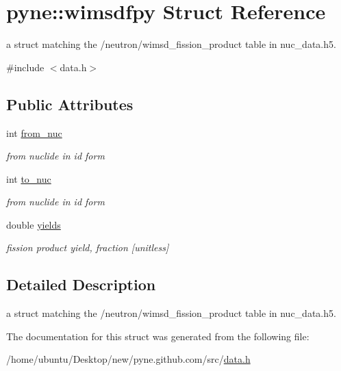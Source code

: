 \hypertarget{structpyne_1_1wimsdfpy}{}\section{pyne\+:\+:wimsdfpy Struct Reference}
\label{structpyne_1_1wimsdfpy}


a struct matching the \textquotesingle{}/neutron/wimsd\+\_\+fission\+\_\+product\textquotesingle{} table in nuc\+\_\+data.\+h5.  




{\ttfamily \#include $<$data.\+h$>$}

\subsection*{Public Attributes}
\begin{DoxyCompactItemize}
\item 
int \hyperlink{structpyne_1_1wimsdfpy_a7521e458719ebb8ed23f4912ec4555f8}{from\+\_\+nuc}\hypertarget{structpyne_1_1wimsdfpy_a7521e458719ebb8ed23f4912ec4555f8}{}\label{structpyne_1_1wimsdfpy_a7521e458719ebb8ed23f4912ec4555f8}

\begin{DoxyCompactList}\small\item\em from nuclide in id form \end{DoxyCompactList}\item 
int \hyperlink{structpyne_1_1wimsdfpy_a2a0f913a64fb76c5c82e1212df7fbb6c}{to\+\_\+nuc}\hypertarget{structpyne_1_1wimsdfpy_a2a0f913a64fb76c5c82e1212df7fbb6c}{}\label{structpyne_1_1wimsdfpy_a2a0f913a64fb76c5c82e1212df7fbb6c}

\begin{DoxyCompactList}\small\item\em from nuclide in id form \end{DoxyCompactList}\item 
double \hyperlink{structpyne_1_1wimsdfpy_a1c20eef7a02f2f62dba113cbf24d8bf2}{yields}\hypertarget{structpyne_1_1wimsdfpy_a1c20eef7a02f2f62dba113cbf24d8bf2}{}\label{structpyne_1_1wimsdfpy_a1c20eef7a02f2f62dba113cbf24d8bf2}

\begin{DoxyCompactList}\small\item\em fission product yield, fraction \mbox{[}unitless\mbox{]} \end{DoxyCompactList}\end{DoxyCompactItemize}


\subsection{Detailed Description}
a struct matching the \textquotesingle{}/neutron/wimsd\+\_\+fission\+\_\+product\textquotesingle{} table in nuc\+\_\+data.\+h5. 

The documentation for this struct was generated from the following file\+:\begin{DoxyCompactItemize}
\item 
/home/ubuntu/\+Desktop/new/pyne.\+github.\+com/src/\hyperlink{data_8h}{data.\+h}\end{DoxyCompactItemize}
